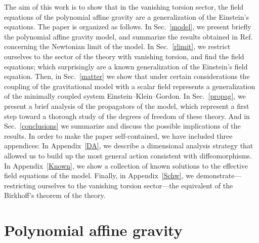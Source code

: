 \documentclass[aps,prd,12pt,twocolumn,superscriptaddress,showpacs,showkeys,reprint%
]{revtex4-1}
\renewcommand{\(}{\left(}
\renewcommand{\)}{\right)}
\renewcommand{\[}{\left[}
\renewcommand{\]}{\right]}
\begin{document}
The aim of this work is to show that in the vanishing torsion sector, the field equations of the polynomial affine gravity are a generalization of the Einstein's equations. %
The paper is organized as follows. In Sec.~\ref{model}, we present briefly the polynomial affine gravity model, and summarize the results obtained in Ref.~\cite{Skirzewski:2014eta} concerning the Newtonian limit of the model. In Sec.~\ref{rlimit}, we restrict ourselves to the sector of the theory with vanishing torsion, and find the field equations; which surprisingly are a known generalization of the Einstein's field equation. Then, in Sec.~\ref{matter} we show that under certain considerations the coupling of the gravitational model with a scalar field represents a generalization of the minimally coupled system Einstein--Klein--Gordon. In Sec.~\ref{propag}, we present a brief analysis of the propagators of the model, which represent a first step toward a thorough study of the degrees of freedom of these theory. And in Sec.~\ref{conclusions} we summarize and discuss the possible implications of the results. In order to make the paper self-contained, we have included three appendices: In Appendix~\ref{DA}, we describe a dimensional analysis strategy that allowed us to build up the most general action consistent with diffeomorphisms. In Appendix~\ref{Known}, we show a collection of known solutions to the effective field equations of the model. Finally, in Appendix~\ref{Schw}, we demonstrate---restricting ourselves to the vanishing torsion sector---the equivalent of the Birkhoff's theorem of the theory.

\section{\label{model}Polynomial affine gravity}
\end{document}
